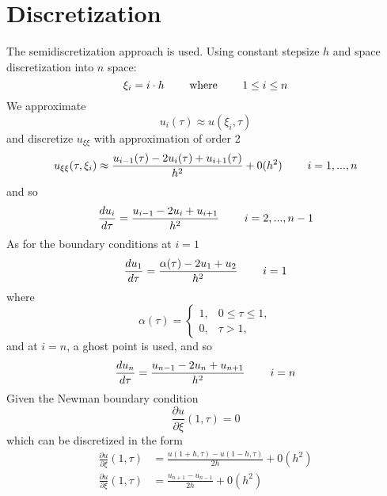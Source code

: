 \documentclass{article}
\begin{document}
\section{Discretization}

The semidiscretization approach is used. Using constant stepsize $h$ and space discretization into $n$ space:
\begin{equation*}
    \xi_i = i \cdot h \hspace{0.8cm} \text{where}  \hspace{0.8cm} 1 \leq i \leq n 
\end{equation*}
We approximate
\begin{equation*}
    u_i(\tau) \approx u(\xi_i,\tau)
\end{equation*}
and discretize $u_{\xi \xi}$ with approximation of order 2
\begin{equation*}
    u_{\xi \xi}(\tau,\xi_i) \approx \frac{u_{i-1}(\tau) - 2u_i(\tau) + u_{i+1}(\tau)}{h^2} + 0(h^2) \hspace{0.8cm} i = 1, ..., n
\end{equation*}
and so
\begin{equation*}
    \frac{d u_i}{d\tau} = \frac{u_{i-1} - 2u_i + u_{i+1}}{h^2}  \hspace{0.8cm} i = 2, ..., n-1
\end{equation*}
As for the boundary conditions at $i = 1$
\begin{equation*}
    \frac{d u_1}{d\tau} = \frac{\alpha(\tau) - 2u_1 + u_{2}}{h^2}  \hspace{0.8cm} i = 1
\end{equation*}
where 
\begin{equation*} 
  \alpha(\tau)= 
\begin{cases}
    1,           & 0 \leq \tau \leq 1, \\
    0,              & \tau > 1,
\end{cases}
\end{equation*}
and at $i = n$, a ghost point is used, and so
\begin{equation*}
    \frac{d u_n}{d\tau} = \frac{u_{n-1} - 2u_n + u_{n+1}}{h^2}  \hspace{0.8cm} i = n
\end{equation*}
Given the Newman boundary condition
\begin{equation*}
    \frac{\partial u}{\partial \xi} (1,\tau) = 0
\end{equation*}
which can be discretized in the form
\begin{equation*}
\begin{split}
        \frac{\partial u}{\partial \xi} (1,\tau) &= \frac{u(1+h,\tau)-u(1-h,\tau)}{2h} + 0(h^2)\\
         \frac{\partial u}{\partial \xi} (1,\tau) &= \frac{u_{n+1}-u_{n-1}}{2h} + 0(h^2)
\end{split}
\end{equation*}
\end{document}

